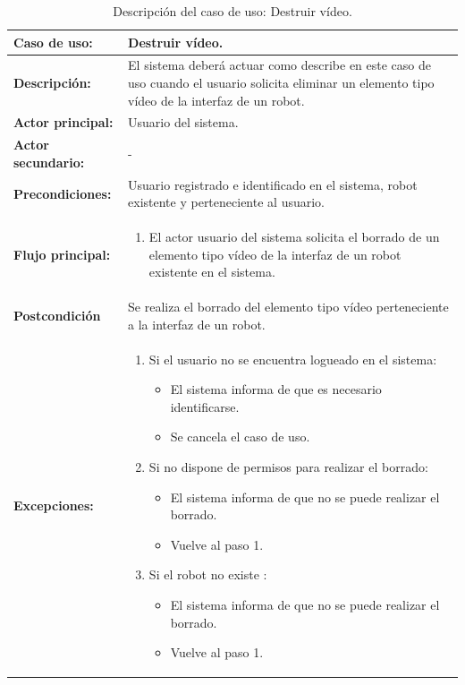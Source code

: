 \begin{table}[H]
  \begin{center}
    \begin{tabular}{|p{3.5cm}|p{10cm}|}
      \hline
      {\textbf{Caso de uso:}} & { Destruir vídeo.} \\
      \hline
      {\textbf{Descripción:}} & { El sistema deberá actuar como describe en este caso de uso cuando el usuario solicita eliminar un elemento tipo vídeo de la interfaz de un robot.} \\
     \hline
      {\textbf{Actor principal:}} & { Usuario del sistema.} \\
      \hline
      {\textbf{Actor secundario:}} & { - } \\
      \hline
      {\textbf{Precondiciones:}} & { Usuario registrado e identificado en el sistema, robot existente y perteneciente al usuario. } \\
     \hline   
    {\textbf{Flujo principal:}} & { 
      \begin{enumerate}
	\item El actor usuario del sistema solicita el borrado de un elemento tipo vídeo de la interfaz de un robot existente en el sistema.
      \end{enumerate}
      } \\
     \hline
     {\textbf{Postcondición}} & {Se realiza el borrado del elemento tipo vídeo perteneciente a la interfaz de un robot.}\\
     \hline
         {\textbf{Excepciones:}} & {
         \begin{enumerate}
         
          \item Si el usuario no se encuentra logueado en el sistema:
	  \begin{itemize}
	    \item El sistema informa de que es necesario identificarse.
	    \item Se cancela el caso de uso.
	  \end{itemize}
         
          \item Si no dispone de permisos para realizar el borrado:
          \begin{itemize}
           \item El sistema informa de que no se puede realizar el borrado.
           \item Vuelve al paso 1.
          \end{itemize}
	  \item Si el robot no existe :
	    \begin{itemize}
	      \item El sistema informa de que no se puede realizar el borrado.
	      \item Vuelve al paso 1.
	   \end{itemize}	   
         \end{enumerate}
         }\\
     \hline
    \end{tabular}
  \end{center}
\caption{Descripción del caso de uso: Destruir vídeo.}
\end{table}




